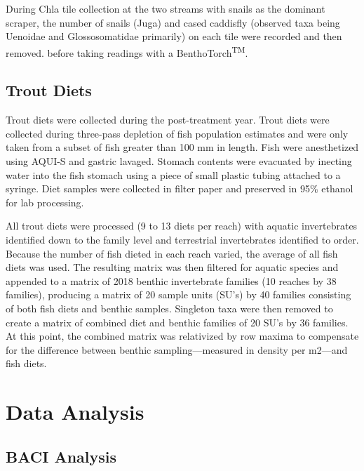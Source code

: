 \documentclass[double,12pt]{beavtex}
\begin{document}
  During Chla tile collection at the two streams with snails as the
  dominant scraper, the number of snails (Juga) and cased caddisfly
  (observed taxa being Uenoidae and Glossosomatidae primarily) on each
  tile were recorded and then removed. before taking readings with a
  BenthoTorch\textsuperscript{TM}.
  
  \subsection*{Trout Diets}\label{trout-diets}
  
  Trout diets were collected during the post-treatment year. Trout diets
  were collected during three-pass depletion of fish population estimates
  and were only taken from a subset of fish greater than 100 mm in length.
  Fish were anesthetized using AQUI-S and gastric lavaged. Stomach
  contents were evacuated by inecting water into the fish stomach using a
  piece of small plastic tubing attached to a syringe. Diet samples were
  collected in filter paper and preserved in 95\% ethanol for lab
  processing.
  
  All trout diets were processed (9 to 13 diets per reach) with aquatic
  invertebrates identified down to the family level and terrestrial
  invertebrates identified to order. Because the number of fish dieted in
  each reach varied, the average of all fish diets was used. The resulting
  matrix was then filtered for aquatic species and appended to a matrix of
  2018 benthic invertebrate families (10 reaches by 38 families),
  producing a matrix of 20 sample units (SU's) by 40 families consisting
  of both fish diets and benthic samples. Singleton taxa were then removed
  to create a matrix of combined diet and benthic families of 20 SU's by
  36 families. At this point, the combined matrix was relativized by row
  maxima to compensate for the difference between benthic
  sampling---measured in density per m2---and fish diets.
  
  \section*{Data Analysis}\label{data-analysis}
  
  \subsection*{BACI Analysis}\label{baci-analysis}
  
\end{document}

